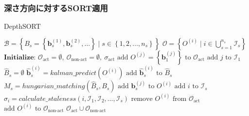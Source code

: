         \subsubsection{深さ方向に対するSORT適用}

        \begin{algorithm}[t]
            \caption[DepthSORT]{DepthSORT}
            \label{alg:depth_sort}
            \begin{algorithmic}[1]
                \Require $\mathcal{B} = \left\{B_s = \left\{\bm{b}_s^{(1)}, \bm{b}_s^{(2)}, \dots\right\} \mid s \in \left\{1, 2, \dots, n_s\right\}\right\}$
                \Ensure $\mathcal{O} = \left\{O^{(i)} \mid i \in \bigcup_{s=1}^{n_s} \mathcal{I}_{s}\right\}$
                \State $\textbf{Initialize: } \mathcal{O}_{\text{act}} = \emptyset,\ \mathcal{O}_{\text{non-act}} = \emptyset,\ \sigma_{\text{act}}$
                    \State $\text{add } O^{(j)} = \left\{\bm{b}_1^{(j)}\right\} \text{ to } \mathcal{O}_{\text{act}}$
                    \State $\text{add } j \text{ to }\mathcal{I}_1$
                \EndFor
                    \State $\hat{B}_s = \emptyset$
                        \State $\hat{\bm{b}}_s^{(i)} = kalman\_predict(O^{(i)})$
                        \State $\text{add } \hat{\bm{b}}_s^{(i)} \text{ to }\hat{B}_s $
                    \EndFor
                    \State $M_s = hungarian\_matching(\hat{B}_s, B_s)$
                        \State $\text{add } \bm{b}_s^{(j)} \text{ to } O^{(i)}$
                        \State $\text{add } i \text{ to } \mathcal{I}_s$
                    \EndFor
                        \State $\sigma_i = calculate\_staleness(i, \mathcal{I}_1, \mathcal{I}_2, \dots, \mathcal{I}_s)$
                            \State $\text{remove } O^{(i)} \text{ from } \mathcal{O}_{\text{act}}$
                            \State $\text{add } O^{(i)} \text{ to } \mathcal{O}_{\text{non-act}}$
                        \EndIf
                    \EndFor
                \EndFor
                \State \Return $\mathcal{O}_{\text{act}} \cup \mathcal{O}_{\text{non-act}}$
            \end{algorithmic}
        \end{algorithm}

